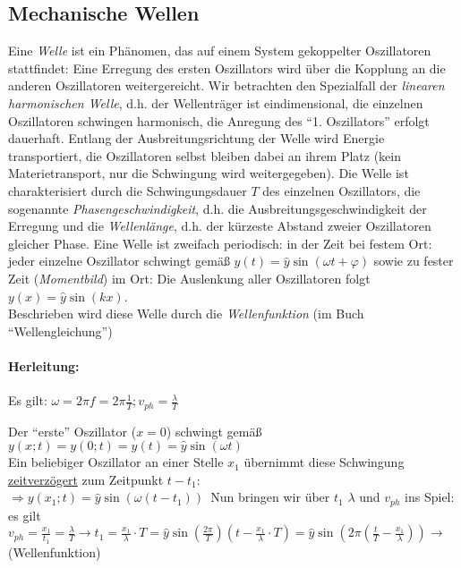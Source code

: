\documentclass[a4paper]{scrartcl}
\begin{document}
\subsection{Mechanische Wellen}
Eine \emph{Welle} ist ein Phänomen, das auf einem System gekoppelter
Oszillatoren stattfindet: Eine Erregung des ersten Oszillators wird über die
Kopplung an die anderen Oszillatoren weitergereicht. Wir betrachten den
Spezialfall der \emph{linearen harmonischen Welle}, d.h. der Wellenträger ist
eindimensional, die einzelnen Oszillatoren schwingen harmonisch, die Anregung
des "`1. Oszillators"' erfolgt dauerhaft. Entlang der Ausbreitungsrichtung der
Welle wird Energie transportiert, die Oszillatoren selbst bleiben dabei an
ihrem Platz (kein Materietransport, nur die Schwingung wird weitergegeben). Die
Welle ist charakterisiert durch die Schwingungsdauer \(T\) des einzelnen
Oszillators, die sogenannte \emph{Phasengeschwindigkeit}, d.h. die
Ausbreitungsgeschwindigkeit der Erregung und die \emph{Wellenlänge}, d.h. der
kürzeste Abstand zweier Oszillatoren gleicher Phase. Eine Welle ist zweifach
periodisch: in der Zeit bei festem Ort: jeder einzelne Oszillator schwingt
gemäß \(y(t) = \hat{y} \sin(\omega t + \varphi)\) sowie zu fester Zeit
(\emph{Momentbild}) im Ort: Die Auslenkung aller Oszillatoren folgt \(y(x) =
\hat{y} \sin(kx)\).\\
Beschrieben wird diese Welle durch die \emph{Wellenfunktion} (im Buch
"`Wellengleichung"')

\paragraph{Herleitung:} Es gilt: \(\omega = 2 \pi f = 2 \pi \frac{1}{T}; v_{ph}
= \frac{\lambda}{T} \)

Der "`erste"' Oszillator (\(x=0\)) schwingt gemäß \(y(x;t) = y(0;t) = y(t) =
\hat{y} \sin(\omega t)\)\\
Ein beliebiger Oszillator an einer Stelle \(x_1\) übernimmt diese Schwingung
\underline{zeitverzögert} zum Zeitpunkt \(t-t_1\):\\
\(\Rightarrow y(x_1;t) = \hat{y} \sin(\omega (t-t_1))\)\, Nun bringen wir über
\(t_1\) \(\lambda\) und \(v_{ph}\) ins Spiel: es gilt \(v_{ph} =
\frac{x_1}{t_1} = \frac{\lambda}{T} \rightarrow t_1 = \frac{x_1}{\lambda} \cdot
T = \hat{y} \sin(\frac{2\pi}{T} )(t - \frac{x_1}{\lambda} \cdot T) = \hat{y}
\sin(2\pi (\frac{t}{T} - \frac{x_1}{\lambda})) \rightarrow\)  (Wellenfunktion)
\end{document}
